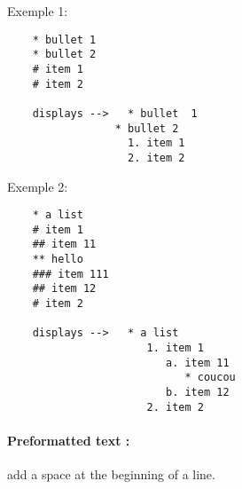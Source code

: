 \documentclass{article}
\begin{document}
		 Exemple 1:
                   \begin{verbatim}
    * bullet 1
    * bullet 2
    # item 1
    # item 2
  
    displays -->   * bullet  1
                 * bullet 2
                   1. item 1
                   2. item 2
		   \end{verbatim}
  
		       Exemple 2:
                   \begin{verbatim}
    * a list
    # item 1
    ## item 11
    ** hello
    ### item 111
    ## item 12
    # item 2

    displays -->   * a list
                      1. item 1
                         a. item 11
                            * coucou
                         b. item 12
                      2. item 2
		   \end{verbatim}
		   


		   
		   
	\paragraph{Preformatted text :} add a space at the beginning of a line. 	
\end{document}
